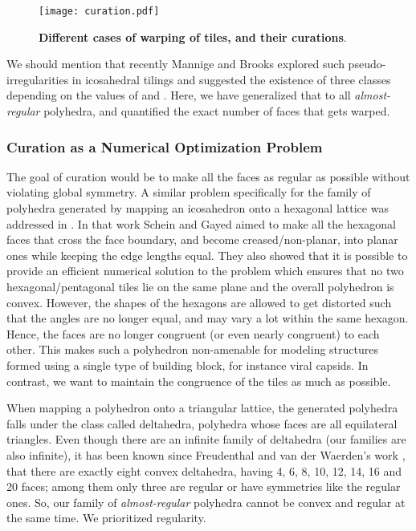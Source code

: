 \documentclass[11pt]{article}
\newcommand{\1}{\mathds{1}}
\begin{document}
\begin{figure}[h!]
\centering
\vspace{-0.6cm}
\texttt{[image: curation.pdf]}
\vspace{-0.3cm}
\caption[Different cases of warping of tiles, and their curations]{ \textbf{Different cases of warping of tiles, and their curations}.}   
\label{fig:assemblytheory:curation}
\vspace{-0.5cm}
\end{figure}

We should mention that recently Mannige and Brooks \cite{Mannige_Brooks_2010} explored such pseudo-irregularities in icosahedral tilings and suggested the existence of three classes depending on the values of  and . Here, we have generalized that to all \emph{almost-regular} polyhedra, and quantified the exact number of faces that gets warped. 


\subsubsection{Curation as a Numerical Optimization Problem}
The goal of curation would be to make all the faces as regular as possible without violating global symmetry. A similar problem specifically for the family of polyhedra generated by mapping an icosahedron onto a hexagonal lattice was addressed in \cite{Schein_Gayed_2014}. In that work Schein and Gayed aimed to make all the hexagonal faces that cross the face boundary, and become creased/non-planar, into planar ones while keeping the edge lengths equal. They also showed that it is possible to provide an efficient numerical solution to the problem which ensures that no two hexagonal/pentagonal tiles lie on the same plane and the overall polyhedron is convex. However, the shapes of the hexagons are allowed to get distorted such that the angles are no longer equal, and may vary a lot within the same hexagon. Hence, the faces are no longer congruent (or even nearly congruent) to each other. This makes such a polyhedron non-amenable for modeling structures formed using a single type of building block, for instance viral capsids. In contrast, we want to maintain the congruence of the tiles as much as possible. 

When mapping a polyhedron onto a triangular lattice, the generated polyhedra falls under the class called deltahedra, polyhedra whose faces are all equilateral triangles. Even though there are an infinite family of deltahedra \cite{Trigg_1978} (our families are also infinite), it has been known since Freudenthal and van der Waerden's work \cite{Freudenthal_1947}, that there are exactly eight convex deltahedra, having 4, 6, 8, 10, 12, 14, 16 and 20 faces; among them only three are regular or have symmetries like the regular ones. So, our family of \emph{almost-regular} polyhedra cannot be convex and regular at the same time. We prioritized regularity. 
\end{document}
